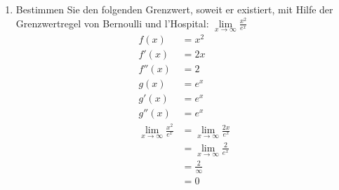 \documentclass[12pt]{article}
\begin{document}
\begin{enumerate}[start=1,label={\bfseries Frage \arabic*:},leftmargin=1in]
    \item Bestimmen Sie den folgenden Grenzwert, soweit er existiert, mit Hilfe der Grenzwertregel von Bernoulli und l'Hospital: $\lim\limits_{x \to \infty} \frac{x^{2}}{e^{x}}$
    \begin{align*}
        f(x)&=x^2 \\
        f'(x)&=2x \\
        f''(x)&=2 \\
        g(x)&=e^x \\
        g'(x)&=e^x \\
        g''(x)&=e^x \\
        \lim_{x \to \infty} \frac{x^2}{e^x} &= \lim_{x \to \infty} \frac{2x}{e^x} \\
        &= \lim_{x \to \infty} \frac{2}{e^x} \\
        &= \frac{2}{\infty} \\
        &= 0
    \end{align*}

\end{enumerate}
\end{document}
